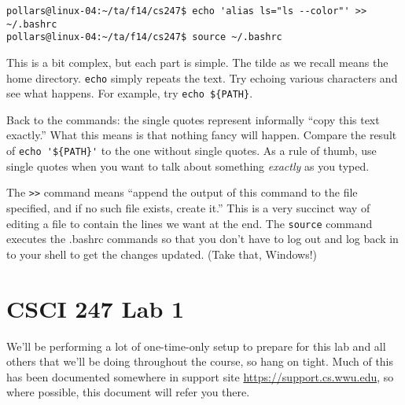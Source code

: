 \documentclass[12pt]{article}
\begin{document}
\begin{verbatim}
pollars@linux-04:~/ta/f14/cs247$ echo 'alias ls="ls --color"' >> ~/.bashrc
pollars@linux-04:~/ta/f14/cs247$ source ~/.bashrc
\end{verbatim}
This is a bit complex, but each part is simple. The tilde as we recall means the home directory. \verb|echo| simply repeats the text. Try echoing various characters and see what happens. For example, try \verb|echo ${PATH}|.

Back to the commands: the single quotes represent informally ``copy this text exactly.'' What this means is that nothing fancy will happen. Compare the result of \verb|echo '${PATH}'| to the one without single quotes. As a rule of thumb, use single quotes when you want to talk about something \emph{exactly} as you typed.

The \verb|>>| command means ``append the output of this command to the file specified, and if no such file exists, create it.'' This is a very succinct way of editing a file to contain the lines we want at the end. The \verb|source| command executes the .bashrc commands so that you don't have to log out and log back in to your shell to get the changes updated. (Take that, Windows!)


\section{CSCI 247 Lab 1}
We'll be performing a lot of one-time-only setup to prepare for this lab and all others that we'll be doing throughout the course, so hang on tight.  Much of this has been documented somewhere in support site \url{https://support.cs.wwu.edu}, so where possible, this document will refer you there.
\end{document}
